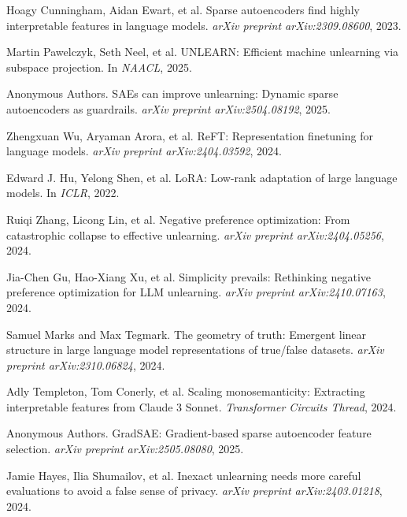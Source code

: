 \documentclass[11pt]{article}
\begin{document}
\begin{thebibliography}{99}
Hoagy Cunningham, Aidan Ewart, et al.
\newblock Sparse autoencoders find highly interpretable features in language models.
\newblock \textit{arXiv preprint arXiv:2309.08600}, 2023.

Martin Pawelczyk, Seth Neel, et al.
\newblock UNLEARN: Efficient machine unlearning via subspace projection.
\newblock In \textit{NAACL}, 2025.

Anonymous Authors.
\newblock SAEs can improve unlearning: Dynamic sparse autoencoders as guardrails.
\newblock \textit{arXiv preprint arXiv:2504.08192}, 2025.

Zhengxuan Wu, Aryaman Arora, et al.
\newblock ReFT: Representation finetuning for language models.
\newblock \textit{arXiv preprint arXiv:2404.03592}, 2024.

Edward J. Hu, Yelong Shen, et al.
\newblock LoRA: Low-rank adaptation of large language models.
\newblock In \textit{ICLR}, 2022.

Ruiqi Zhang, Licong Lin, et al.
\newblock Negative preference optimization: From catastrophic collapse to effective unlearning.
\newblock \textit{arXiv preprint arXiv:2404.05256}, 2024.

Jia-Chen Gu, Hao-Xiang Xu, et al.
\newblock Simplicity prevails: Rethinking negative preference optimization for LLM unlearning.
\newblock \textit{arXiv preprint arXiv:2410.07163}, 2024.

Samuel Marks and Max Tegmark.
\newblock The geometry of truth: Emergent linear structure in large language model representations of true/false datasets.
\newblock \textit{arXiv preprint arXiv:2310.06824}, 2024.

Adly Templeton, Tom Conerly, et al.
\newblock Scaling monosemanticity: Extracting interpretable features from Claude 3 Sonnet.
\newblock \textit{Transformer Circuits Thread}, 2024.

Anonymous Authors.
\newblock GradSAE: Gradient-based sparse autoencoder feature selection.
\newblock \textit{arXiv preprint arXiv:2505.08080}, 2025.

Jamie Hayes, Ilia Shumailov, et al.
\newblock Inexact unlearning needs more careful evaluations to avoid a false sense of privacy.
\newblock \textit{arXiv preprint arXiv:2403.01218}, 2024.


\end{thebibliography}
\end{document}
